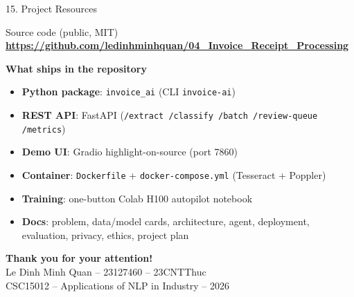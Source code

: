 \documentclass[10pt,aspectratio=169]{beamer}
\begin{document}
\begin{frame}{15. Project Resources}
\begin{block}{Source code (public, MIT)}
\centering
\large \textbf{\url{https://github.com/ledinhminhquan/04_Invoice_Receipt_Processing}}
\end{block}

\textbf{What ships in the repository}
\begin{itemize}\scriptsize
  \item \textbf{Python package}: \texttt{invoice\_ai} (CLI \texttt{invoice-ai})
  \item \textbf{REST API}: FastAPI (\texttt{/extract /classify /batch /review-queue /metrics})
  \item \textbf{Demo UI}: Gradio highlight-on-source (port 7860)
  \item \textbf{Container}: \texttt{Dockerfile} + \texttt{docker-compose.yml} (Tesseract + Poppler)
  \item \textbf{Training}: one-button Colab H100 autopilot notebook
  \item \textbf{Docs}: problem, data/model cards, architecture, agent, deployment, evaluation, privacy, ethics, project plan
\end{itemize}

\vspace{0.3cm}
\centering
\Large\textbf{Thank you for your attention!}\\[0.2cm]
\normalsize Le Dinh Minh Quan -- 23127460 -- 23CNTThuc \\
\small CSC15012 -- Applications of NLP in Industry -- 2026
\end{frame}
\end{document}
